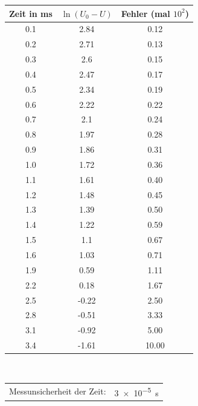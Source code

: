 \begin{figure}[h!]
	\centering
	\begin{tabular}{c|c|c}
		Zeit in \si{\milli\second}& $\ln(U_0-U)$ & Fehler (mal $10^2$)\\
		\hline
		0.1 &  2.84 &  0.12 \\
		0.2 &  2.71 &  0.13 \\
		0.3 &  2.6  &  0.15 \\
		0.4 &  2.47 &  0.17 \\
		0.5 &  2.34 &  0.19 \\
		0.6 &  2.22 &  0.22 \\
		0.7 &  2.1  &  0.24 \\
		0.8 &  1.97 &  0.28 \\
		0.9 &  1.86 &  0.31 \\
		1.0   &  1.72 &  0.36 \\
		1.1 &  1.61 &  0.40  \\
		1.2 &  1.48 &  0.45 \\
		1.3 &  1.39 &  0.50  \\
		1.4 &  1.22 &  0.59 \\
		1.5 &  1.1  &  0.67 \\
		1.6 &  1.03 &  0.71 \\
		1.9 &  0.59 &  1.11 \\
		2.2 &  0.18 &  1.67 \\
		2.5 & -0.22 &  2.50  \\
		2.8 & -0.51 &  3.33 \\
		3.1 & -0.92 &  5.00   \\
		3.4 & -1.61 & 10.00    \\
	\end{tabular}
	\label{tab:aufladekurve}
	\\
	\vspace{1cm}
	\begin{tabular}{ll}
		Messunsicherheit der Zeit: & \SI{3e-5}{\second}
	\end{tabular}
\end{figure}



\clearpage
